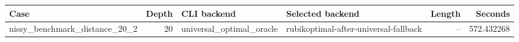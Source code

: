 {\small
\begin{tabular}{lrllrr}
\hline
Case & Depth & CLI backend & Selected backend & Length & Seconds \\
\hline
nissy\_benchmark\_distance\_20\_2 & 20 & universal\_optimal\_oracle & rubikoptimal-after-universal-fallback & -- & 572.432268 \\
\hline
\end{tabular}
}

